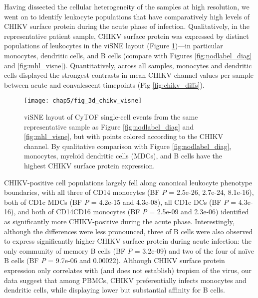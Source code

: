 Having dissected the cellular heterogeneity of the samples at high resolution, we went on to identify leukocyte populations that have comparatively high levels of CHIKV surface protein during the acute phase of infection. Qualitatively, in the representative patient sample, CHIKV surface protein was expressed by distinct populations of leukocytes in the viSNE layout (Figure \ref{fig:chikv_visne})—in particular monocytes, dendritic cells, and B cells (compare with Figures \ref{fig:nodlabel_diag} and \ref{fig:mhl_visne}). Quantitatively, across all samples, monocytes and dendritic cells displayed the strongest contrasts in mean CHIKV channel values per sample between acute and convalescent timepoints (Fig \ref{fig:chikv_diffs}).
\begin{figure}[htb]
  \centering
  \texttt{[image: chap5/fig\_3d\_chikv\_visne]}
  \caption[viSNE layout of CHIKV surface protein expression levels]{viSNE layout of CyTOF single-cell events from the same representative sample as Figure \ref{fig:nodlabel_diag} and \ref{fig:mhl_visne}, but with points colored according to the CHIKV channel. By qualitative comparison with Figure \ref{fig:nodlabel_diag}, monocytes, myeloid dendritic cells (MDCs), and B cells have the highest CHIKV surface protein expression. 
  }
  \label{fig:chikv_visne}
\end{figure}
CHIKV-positive cell populations largely fell along canonical leukocyte phenotype boundaries, with all three \subcommunities{} of CD14\sups{+} monocytes (BF \emph{P} = 2.5e-26, 2.7e-24, 8.1e-16), both \subcommunities{} of CD1c MDCs (BF \emph{P} = 4.2e-15 and 4.3e-08), all CD1c DCs (BF \emph{P} = 4.3e-16), and both \subcommunities{} of CD14\sups{+}\allowbreak CD16\sups{+} monocytes (BF \emph{P} = 2.5e-09 and 2.3e-06) identified as significantly more CHIKV-positive during the acute phase. Interestingly, although the differences were less pronounced, three \subcommunities{} of B cells were also observed to express significantly higher CHIKV surface protein during acute infection: the only community of memory B cells (BF \emph{P} = 3.2e-09) and two of the four \subcommunities{} of naïve B cells (BF \emph{P} = 9.7e-06 and 0.00022). Although CHIKV surface protein expression only correlates with (and does not establish) tropism of the virus, our data suggest that among PBMCs, CHIKV preferentially infects monocytes and dendritic cells, while displaying lower but substantial affinity for B cells.

